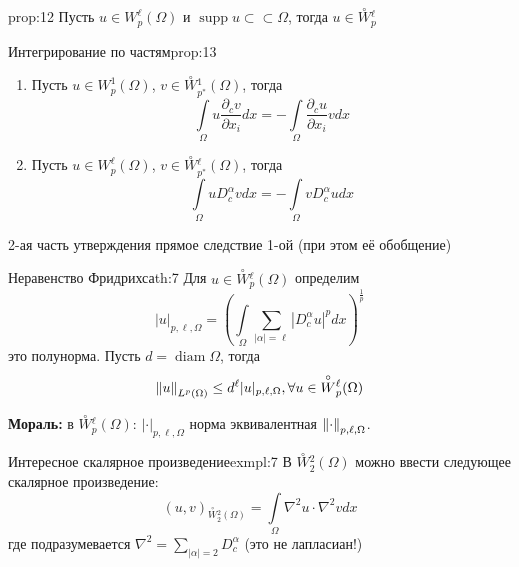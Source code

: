 \documentclass[12pt,a4paper]{article}
\newcommand{\intset}[1]{\int\limits_{#1}}
\newcommand{\ssubset}{\subset \subset}
\newcommand{\zeroW}[2]{\overset{\circ}{W}{}_{#1}^{#2}}
\DeclareMathOperator\supp{supp}
\DeclareMathOperator\diam{diam}
\begin{document}
\begin{proposition}{}{prop:12}
	Пусть $u \in W_p^\ell (\Omega)$ и $\supp{u} \ssubset \Omega$, тогда $u \in \zeroW{p}{\ell}$
\end{proposition}

\begin{proposition}{Интегрирование по частям}{prop:13}
	\begin{enumerate}
		\item Пусть $u \in W_p^1 (\Omega)$, $v \in \zeroW{{p^*}}{1} (\Omega)$, тогда
			\begin{equation*}
			\intset{\Omega}{u \frac{\partial_c v}{\partial x_i} dx} = -\intset{\Omega}{\frac{\partial_c u}{\partial x_i} v dx}
			\end{equation*}
		\item Пусть $u \in W_p^\ell (\Omega)$, $v \in \zeroW{p^*}{\ell} (\Omega)$, тогда
			\begin{equation*}
			\intset{\Omega}{u D_c^\alpha v dx} = -\intset{\Omega}{v D_c^\alpha u dx}
			\end{equation*}
	\end{enumerate}
	2-ая часть утверждения прямое следствие 1-ой (при этом её обобщение)
\end{proposition}

\begin{theorem}{Неравенство Фридрихса}{th:7}
	Для $u \in \zeroW{p}{\ell} (\Omega)$ определим 
	\begin{equation*}
		|u|_{p, \ell, \Omega} = \left(\intset{\Omega}{\sum_{|\alpha| = \ell}{|D_c^\alpha u|^p} dx}\right)^{\frac{1}{p}}
	\end{equation*}
	это полунорма. Пусть $d = \diam{\Omega}$, тогда
	\begin{equation*}
		\norm{u}_{L^p (\Omega)} \leq d^\ell |u|_{p, \ell, \Omega}, \forall u \in \zeroW{p}{\ell} (\Omega)
	\end{equation*}
\end{theorem}
\textbf{Мораль:} в $\zeroW{p}{\ell} (\Omega)$: $|\cdot|_{p, \ell, \Omega}$ норма эквивалентная $\norm{\cdot}_{p, \ell, \Omega}$.

\begin{example}{Интересное скалярное произведение}{exmpl:7}
	В $\zeroW{2}{2} (\Omega)$ можно ввести следующее скалярное произведение:
	\begin{equation*}
		(u, v)_{\zeroW{2}{2} (\Omega)} = \intset{\Omega}{\nabla^2 u \cdot \nabla^2 v dx}
	\end{equation*}
	где подразумевается $\nabla^2 = \sum\limits_{|\alpha| = 2}{D_c^\alpha}$ (это не лапласиан!)
\end{example}
\end{document}
